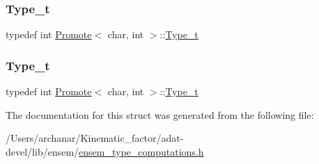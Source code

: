 \subsubsection{\texorpdfstring{Type\_t}{Type\_t}\hspace{0.1cm}{\footnotesize\ttfamily [2/3]}}
{\footnotesize\ttfamily typedef int \mbox{\hyperlink{structPromote}{Promote}}$<$ char, int $>$\+::\mbox{\hyperlink{structPromote_3_01char_00_01int_01_4_aa4465fce51bfd64e6f93b628ecbec70f}{Type\+\_\+t}}}

\mbox{\label{structPromote_3_01char_00_01int_01_4_aa4465fce51bfd64e6f93b628ecbec70f}} 
\subsubsection{\texorpdfstring{Type\_t}{Type\_t}\hspace{0.1cm}{\footnotesize\ttfamily [3/3]}}
{\footnotesize\ttfamily typedef int \mbox{\hyperlink{structPromote}{Promote}}$<$ char, int $>$\+::\mbox{\hyperlink{structPromote_3_01char_00_01int_01_4_aa4465fce51bfd64e6f93b628ecbec70f}{Type\+\_\+t}}}



The documentation for this struct was generated from the following file\+:\begin{DoxyCompactItemize}
\item 
/\+Users/archanar/\+Kinematic\+\_\+factor/adat-\/devel/lib/ensem/\mbox{\hyperlink{adat-devel_2lib_2ensem_2ensem__type__computations_8h}{ensem\+\_\+type\+\_\+computations.\+h}}\end{DoxyCompactItemize}
